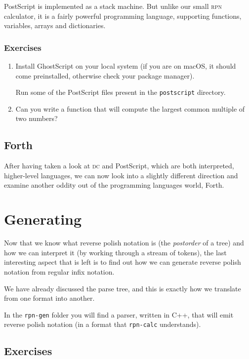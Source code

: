 \documentclass[a4paper,twocolumn]{article}
\begin{document}
PostScript is implemented as a stack machine. But unlike our small \textsc{rpn} calculator, it is a fairly powerful programming language, supporting functions, variables, arrays and dictionaries.

\subsubsection*{Exercises}

\begin{enumerate}
  \item Install GhostScript on your local system (if you are on macOS, it should come preinstalled, otherwise check your package manager).

    Run some of the PostScript files present in the \verb|postscript| directory. 
  \item Can you write a function that will compute the largest common multiple of two numbers?
\end{enumerate}

\subsection{Forth}

After having taken a look at \textsc{dc} and PostScript, which are both interpreted, higher-level languages, we can now look into a slightly different direction and examine another oddity out of the programming languages world, Forth. 

\section{Generating}

Now that we know what reverse polish notation is (the \emph{postorder} of a tree) and how we can interpret it (by working through a stream of tokens), the last interesting aspect that is left is to find out how we can generate reverse polish notation from regular infix notation. 

We have already discussed the parse tree, and this is exactly how we translate from one format into another.

In the \verb|rpn-gen| folder you will find a parser, written in C++, that will emit reverse polish notation (in a format that \verb|rpn-calc| understands). 

\subsection*{Exercises}
\end{document}
